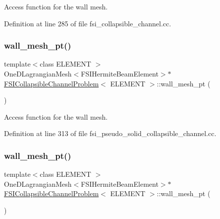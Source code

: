 Access function for the wall mesh. 



Definition at line 285 of file fsi\+\_\+collapsible\+\_\+channel.\+cc.

\mbox{\label{classFSICollapsibleChannelProblem_ae8b71da8da82f3c52387052ce400b930}} 
\subsubsection{\texorpdfstring{wall\+\_\+mesh\+\_\+pt()}{wall\_mesh\_pt()}\hspace{0.1cm}{\footnotesize\ttfamily [3/4]}}
{\footnotesize\ttfamily template$<$class E\+L\+E\+M\+E\+NT $>$ \\
One\+D\+Lagrangian\+Mesh$<$F\+S\+I\+Hermite\+Beam\+Element$>$$\ast$ \hyperlink{classFSICollapsibleChannelProblem}{F\+S\+I\+Collapsible\+Channel\+Problem}$<$ E\+L\+E\+M\+E\+NT $>$\+::wall\+\_\+mesh\+\_\+pt (\begin{DoxyParamCaption}{ }\end{DoxyParamCaption})\hspace{0.3cm}{\ttfamily [inline]}}



Access function for the wall mesh. 



Definition at line 313 of file fsi\+\_\+pseudo\+\_\+solid\+\_\+collapsible\+\_\+channel.\+cc.

\mbox{\label{classFSICollapsibleChannelProblem_ae8b71da8da82f3c52387052ce400b930}} 
\subsubsection{\texorpdfstring{wall\+\_\+mesh\+\_\+pt()}{wall\_mesh\_pt()}\hspace{0.1cm}{\footnotesize\ttfamily [4/4]}}
{\footnotesize\ttfamily template$<$class E\+L\+E\+M\+E\+NT $>$ \\
One\+D\+Lagrangian\+Mesh$<$F\+S\+I\+Hermite\+Beam\+Element$>$$\ast$ \hyperlink{classFSICollapsibleChannelProblem}{F\+S\+I\+Collapsible\+Channel\+Problem}$<$ E\+L\+E\+M\+E\+NT $>$\+::wall\+\_\+mesh\+\_\+pt (\begin{DoxyParamCaption}{ }\end{DoxyParamCaption})\hspace{0.3cm}{\ttfamily [inline]}}



